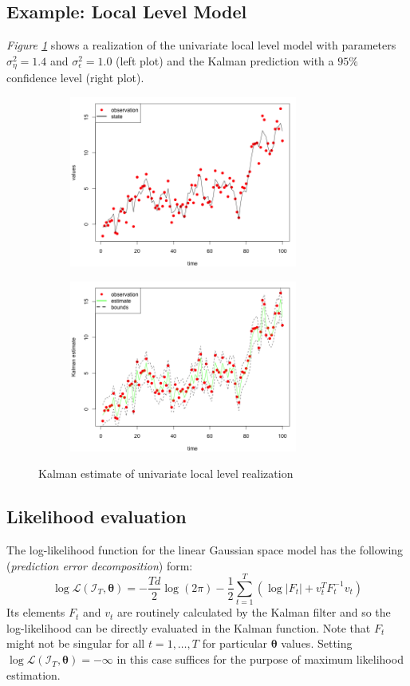 \documentclass[11pt, oneside]{scrreprt}   	%
\begin{document}
\subsection{Example: Local Level Model}
\textit{Figure \ref{fig:ullm-kalman}} shows a realization of the univariate local level model with parameters $\sigma_{\eta}^2=1.4$ and $\sigma_{\epsilon}^2=1.0$ (left plot) and the Kalman prediction with a $95\%$ confidence level (right plot).
\begin{figure}[h!]
\centering
\begin{subfigure}{.5\textwidth}
  \centering
  \includegraphics[width=75mm]{../../images/ullm-realization.png}
\end{subfigure}%
\begin{subfigure}{.5\textwidth}
  \centering
  \includegraphics[width=75mm]{../../images/ullm-estimate-kalman.png}
\end{subfigure}
\caption{Kalman estimate of univariate local level realization}
\label{fig:ullm-kalman}
\end{figure}

\subsection{Likelihood evaluation}
The log-likelihood function for the linear Gaussian space model has the following (\textit{prediction error decomposition}) form:
$$
\log \mathcal{L}(\mathcal{I}_T, \boldsymbol{\theta}) = -\frac{Td}{2} \log(2 \pi) - \frac{1}{2} \sum_{t=1}^T (\log |F_t| + v_t^TF_t^{-1} v_t)
$$
Its elements $F_t$ and $v_t$ are routinely calculated by the Kalman filter and so the log-likelihood can be directly evaluated in the Kalman function. Note that $F_t$ might not be singular for all $t=1,\ldots, T$ for particular $\boldsymbol{\theta}$ values. Setting $\log \mathcal{L}(\mathcal{I}_T, \boldsymbol{\theta}) = -\infty$ in this case suffices for the purpose of maximum likelihood estimation.
\end{document}
